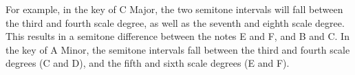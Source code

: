 \begin{itemize}
    For example, in the key of C Major, the two semitone intervals will fall between the third and fourth scale degree, as well as the seventh and eighth scale degree. This results in a semitone difference between the notes E and F, and B and C. In the key of A Minor, the semitone intervals fall between the third and fourth scale degrees (C and D), and the fifth and sixth scale degrees (E and F).
    
\end{itemize}